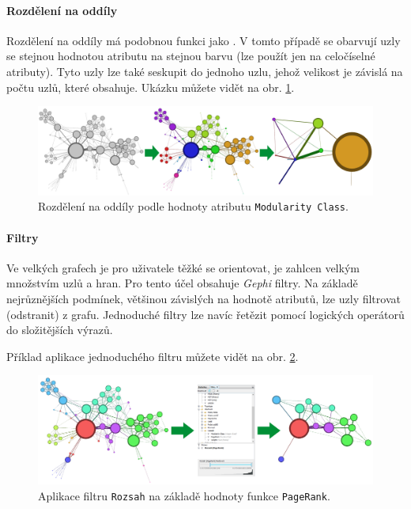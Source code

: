 \documentclass[thesis=M,czech]{FITthesis}[2014/05/6]
\begin{document}
\paragraph{Rozdělení na oddíly}
Rozdělení na oddíly má podobnou funkci jako . V tomto případě se obarvují uzly se stejnou hodnotou atributu na stejnou barvu (lze použít jen na celočíselné
atributy). Tyto uzly lze také seskupit do jednoho uzlu, jehož velikost je závislá na počtu uzlů, které obsahuje. Ukázku můžete vidět na obr. \ref{fig:gephi-grouping}.

\begin{figure}\centering
 	\includegraphics[width=1\textwidth]{images/gephi/grouping_before-after}
 	\caption[Rozdělení na oddíly podle hodnoty atributu \texttt{Modularity Class}]{Rozdělení na oddíly podle hodnoty atributu \texttt{Modularity Class}.}\label{fig:gephi-grouping}
\end{figure}

\paragraph{Filtry}
Ve velkých grafech je pro uživatele těžké se orientovat, je zahlcen velkým množstvím uzlů a hran. Pro tento účel obsahuje \textit{Gephi} filtry. Na základě nejrůznějších podmínek, většinou 
závislých na hodnotě atributů, lze uzly filtrovat (odstranit) z grafu. Jednoduché filtry lze navíc řetězit pomocí logických operátorů do složitějších výrazů.

Příklad aplikace jednoduchého filtru můžete vidět na obr. \ref{fig:gephi-filter}.

\begin{figure}\centering
 	\includegraphics[width=1\textwidth]{images/gephi/filter_before-after}
 	\caption[Aplikace filtru \texttt{Rozsah} na základě hodnoty funkce \texttt{PageRank}]{Aplikace filtru \texttt{Rozsah} na základě hodnoty funkce \texttt{PageRank}.}\label{fig:gephi-filter}
\end{figure}
\end{document}

